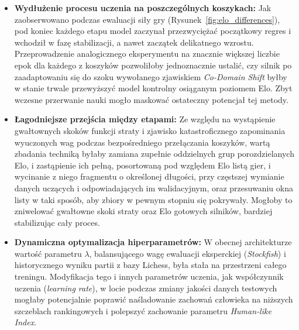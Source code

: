 \documentclass[12pt,a4paper]{report}
\begin{document}
\begin{itemize}
    \item \textbf{Wydłużenie procesu uczenia na poszczególnych koszykach:} Jak zaobserwowano podczas ewaluacji siły gry (Rysunek~\ref{fig:elo_differences}), pod koniec każdego etapu model zaczynał przezwyciężać początkowy regres i wchodził w fazę stabilizacji, a nawet zaczątek delikatnego wzrostu. Przeprowadzenie analogicznego eksperymentu na znacznie większej liczbie epok dla każdego z koszyków pozwoliłoby jednoznacznie ustalić, czy silnik po zaadaptowaniu się do szoku wywołanego zjawiskiem \textit{Co-Domain Shift} byłby w stanie trwale przewyższyć model kontrolny osiąganym poziomem Elo. Zbyt wczesne przerwanie nauki mogło maskować ostateczny potencjał tej metody.
    \item \textbf{Łagodniejsze przejścia między etapami:} Ze względu na wystąpienie gwałtownych skoków funkcji straty i zjawisko katastroficznego zapominania wyuczonych wag podczas bezpośredniego przełączania koszyków, wartą zbadania techniką byłaby zamiana zupełnie oddzielnych grup porozdzielanych Elo, i zastąpienie ich pełną, posortowaną pod względem Elo listą gier, i wycinanie z niego fragmentu o określonej długości, przy częstszej wymianie danych uczących i odpowiadających im walidacyjnym, oraz przesuwaniu okna listy w taki sposób, aby zbiory w pewnym stopniu się pokrywały. Mogłoby to zniwelować gwałtowne skoki straty oraz Elo gotowych silników, bardziej stabilizując cały proces.
    \item \textbf{Dynamiczna optymalizacja hiperparametrów:} W obecnej architekturze wartość parametru $\lambda$, balansującego wagę ewaluacji eksperckiej (\textit{Stockfish}) i historycznego wyniku partii z bazy Lichess, była stała na przestrzeni całego treningu. Modyfikacja tego i innych parametrów uczenia, jak współczynnik uczenia (\textit{learning rate}), w locie podczas zmiany jakości danych testowych mogłaby potencjalnie poprawić naśladowanie zachowań człowieka na niższych szczeblach rankingowych i polepszyć zachowanie parametru \textit{Human-like Index}.
\end{itemize}




\listoffigures
\end{document}

